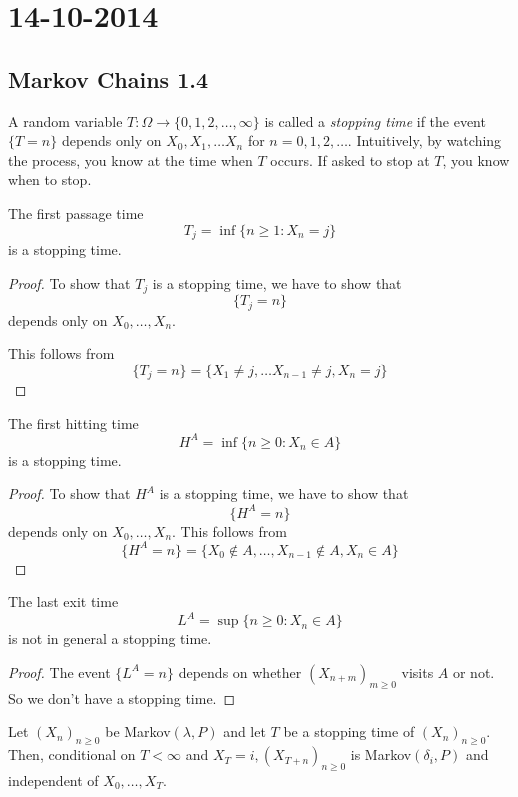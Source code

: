 \section{14-10-2014}
\subsection{Markov Chains 1.4}
\begin{defn}
A random variable \(T:\Omega \rightarrow \{0,1,2,\ldots ,\infty \}\) is called a \emph{stopping time} if the event \(\{T=n\}\) depends only on \(X_{0},X_{1},\ldots X_{n}\) for \(n=0,1,2,\ldots \). Intuitively, by watching the process, you know at the time when \(T\) occurs. If asked to stop at \(T\), you know when to stop.
\end{defn}

\begin{prop}
The first passage time
\[
T_{j}=\inf\{n\geq 1:X_{n}=j\}
\]
is a stopping time.
\end{prop}

\begin{proof}
To show that \(T_{j}\) is a stopping time, we have to show that
\[
\{T_{j}=n\}
\]
depends only on \(X_{0},\ldots ,X_{n}\).

This follows from
\[
\{T_{j}=n\}=\{X_{1}\neq j,\ldots X_{n-1}\neq j,X_{n}=j\}
\]
\end{proof}

\begin{prop}
The first hitting time
\[
H^A=\inf\{n\geq 0:X_{n}\in A\}
\]
is a stopping time.
\end{prop}

\begin{proof}
To show that \(H^A\) is a stopping time, we have to show that
\[
\{H^A=n\}
\]
depends only on \(X_{0},\ldots ,X_{n}\).
This follows from
\[
\{H^A=n\}=\{X_{0}\not\in A,\ldots ,X_{n-1}\not\in A,X_{n}\in A\}
\]
\end{proof}

\begin{prop}
The last exit time
\[
L^A=\sup\{n\geq 0:X_{n}\in A\}
\]
is not in general a stopping time.
\end{prop}

\begin{proof}
The event \(\{L^A=n\}\) depends on whether \((X_{n+m})_{m\geq 0}\) visits \(A\) or not. So we don't have a stopping time.
\end{proof}

\begin{thm}
Let \((X_{n})_{n\geq 0}\) be Markov\((\lambda ,P)\) and let \(T\) be a stopping time of \((X_{n})_{n\geq 0}\). Then, conditional on \(T<\infty \) and \(X_T=i,(X_{T+n})_{n\geq 0}\) is Markov\((\delta _{i},P)\) and independent of \(X_{0},\ldots ,X_T\).
\end{thm}

